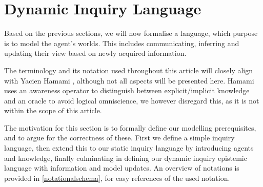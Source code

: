 \section{Dynamic Inquiry Language} \label{sec:DynamicInquiryLanguage}
Based on the previous sections, we will now formalise a language, which
purpose is to model the agent's worlds. This includes communicating, inferring
and updating their view based on newly acquired information. 

The terminology and its notation used throughout this article will closely
align with Yacien Hamami \cite{delimi}, although not all aspects will be
presented here. Hamami uses an awareness operator to distinguish between
explicit/implicit knowledge and an oracle to avoid logical omniscience, we
however disregard this, as it is not within the scope of this article.

The motivation for this section is to formally define our modelling
prerequisites, and to argue for the correctness of these. First we define a 
simple inquiry language, then extend this to our static
inquiry language by introducing agents and knowledge, finally culminating in
defining our dynamic inquiry epistemic language with information and model
updates. An overview of notations is provided in \cref{notationalschema}, for
easy references of the used notation. \\

